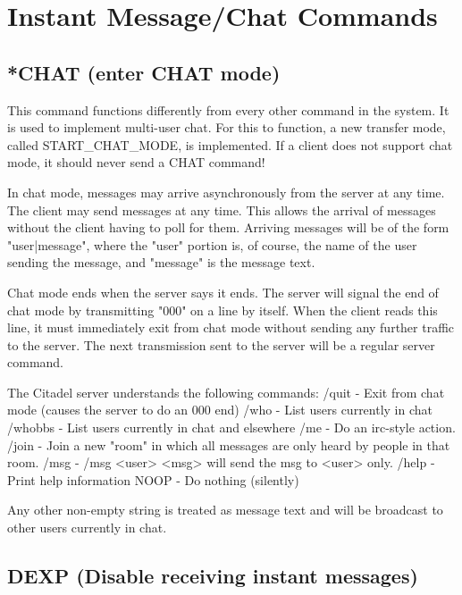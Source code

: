 \section{Instant Message/Chat Commands}



\subsection{*CHAT (enter CHAT mode)}

 This command functions differently from every other command in the system.  It
is used to implement multi-user chat.  For this to function, a new transfer
mode, called START_CHAT_MODE, is implemented.  If a client does not support
chat mode, it should never send a CHAT command!

 In chat mode, messages may arrive asynchronously from the server at any
time.  The client may send messages at any time.  This allows the arrival of
messages without the client having to poll for them.  Arriving messages will
be of the form  "user|message", where the "user" portion is, of course, the
name of the user sending the message, and "message" is the message text.

 Chat mode ends when the server says it ends.  The server will signal the end
of chat mode by transmitting "000" on a line by itself.  When the client reads
this line, it must immediately exit from chat mode without sending any
further traffic to the server.  The next transmission sent to the server
will be a regular server command.

 The Citadel server understands the following commands:
 /quit   -   Exit from chat mode (causes the server to do an 000 end)
 /who    -   List users currently in chat
 /whobbs -   List users currently in chat and elsewhere
 /me     -   Do an irc-style action.
 /join   -   Join a new "room" in which all messages are only heard by
             people in that room.
 /msg    -   /msg <user> <msg> will send the msg to <user> only.
 /help   -   Print help information
 NOOP    -   Do nothing (silently)

 Any other non-empty string is treated as message text and will be broadcast
to other users currently in chat.



\subsection{DEXP (Disable receiving instant messages)}

